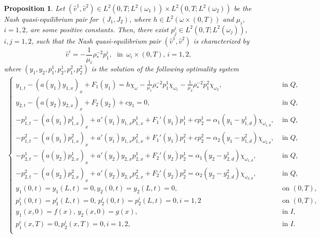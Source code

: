 \documentclass[11pt,a4paper]{amsart}
\numberwithin{equation}{section}
\newtheorem{proposition}{Proposition}[section]
\begin{document}
\begin{proposition}\label{propo_cara_equi_nash}
    Let $(\widehat{v}^1, \widehat{v}^2) \in  L^2(0,T;L^2(\omega_1))\times L^2(0,T;L^2(\omega_2))$ be the Nash quasi-equilibrium pair for $(J_1, J_2)$, where $h \in L^2(\omega\times (0,T))$ and $\mu_i$, $i = 1, 2$, are some positive constants.  Then, there exist $p_j^i \in L^2(0,T;L^2(\omega_j))$,  $i,j = 1, 2$, such that the Nash quasi-equilibrium pair $(\widehat{v}^1, \widehat{v}^2)$  is characterized by
    \begin{equation} \label{carac1}
        \widehat{v}^i = -\frac{1}{\mu_i}\rho_*^{-2}p_1^i, \, \,  \text{  in  } \, \omega_i\times( 0,T),\,  i = 1, 2,
    \end{equation}
    where $(y_1, y_2, p_1^1, p_2^1,p_1^2, p_2^2)$ is the solution of the following optimality system
    	\begin{align} \label{to1}
    		\begin{cases}
    			y_{1,t}-(a(y_1)y_{1,x})_x + F_1(y_1)   = h\chi_\omega-\frac{1}{\mu_1}\rho_*^{-2}p_1^1\chi_{\omega_1}-\frac{1}{\mu_2}\rho_*^{-2}p_1^2\chi_{\omega_2}, &\text{ in } Q,\\  
    			y_{2,t}-(a(y_2)y_{2,x})_x + F_2(y_2)  +cy_1 = 0, &\text{ in } Q,\\  
    			-p_{1,t}^1-(a(y_1)p_{1,x}^1)_x + a'(y_1)y_{1,x}p_{1,x}^1+F_1'(y_1)p_1^1+cp_2^1=\alpha_1(y_1-y_{1,d}^1)\chi_{\omega_{1,d}}, &\text{ in } Q,\\  
    			-p_{1,t}^2-(a(y_1)p_{1,x}^2)_x + a'(y_1)y_{1,x}p_{1,x}^2+F_1'(y_1)p_1^2+cp_2^2=\alpha_2(y_1-y_{1,d}^2)\chi_{\omega_{2,d}}, &\text{ in } Q,\\  
    			-p_{2,t}^1-(a(y_2)p_{2,x}^1)_x + a'(y_2)y_{2,x}p_{2,x}^1+F_2'(y_2)p_2^1=\alpha_1(y_2-y_{2,d}^1)\chi_{\omega_{1,d}}, &\text{ in } Q,\\  
    			-p_{2,t}^2-(a(y_2)p_{2,x}^2)_x + a'(y_2)y_{2,x}p_{2,x}^2+F_2'(y_2)p_2^2=\alpha_2(y_2-y_{2,d}^2)\chi_{\omega_{2,d}}, &\text{ in } Q,\\  
    			y_1(0,t) = y_1(L,t) =0, y_2(0,t) = y_2(L,t) = 0, &\text{ on } (0,T),\\  
    			p_1^i(0,t) = p_1^i(L,t) =0, \, p_2^i(0,t) = p_2^i(L,t) = 0, i=1,2&\text{ on } (0,T),\\
    			y_1(x,0) = f(x), \,  y_2(x,0) = g(x), &\text{ in } I,\\
    			p_1^i(x,T) =0, p_2^i(x,T) =0, i=1,2, &\text{ in } I.\\
    		\end{cases}
    	\end{align}
\end{proposition}
\end{document}
